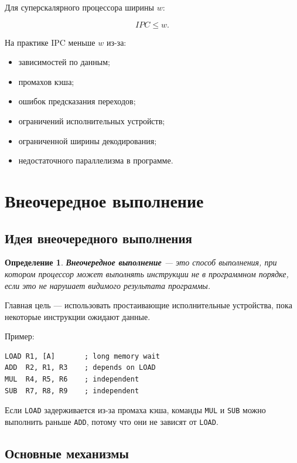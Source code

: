 \documentclass[12pt,a4paper]{article}
\newtheorem{definition}{Определение}
\begin{document}
Для суперскалярного процессора ширины $w$:

\[
    IPC \leq w.
\]

На практике IPC меньше $w$ из-за:

\begin{itemize}
    \item зависимостей по данным;
    \item промахов кэша;
    \item ошибок предсказания переходов;
    \item ограничений исполнительных устройств;
    \item ограниченной ширины декодирования;
    \item недостаточного параллелизма в программе.
\end{itemize}

\section{Внеочередное выполнение}

\subsection{Идея внеочередного выполнения}

\begin{definition}
\textbf{Внеочередное выполнение} --- это способ выполнения, при котором процессор может выполнять инструкции не в программном порядке, если это не нарушает видимого результата программы.
\end{definition}

Главная цель --- использовать простаивающие исполнительные устройства, пока некоторые инструкции ожидают данные.

Пример:

\begin{lstlisting}
LOAD R1, [A]       ; long memory wait
ADD  R2, R1, R3    ; depends on LOAD
MUL  R4, R5, R6    ; independent
SUB  R7, R8, R9    ; independent
\end{lstlisting}

Если \texttt{LOAD} задерживается из-за промаха кэша, команды \texttt{MUL} и \texttt{SUB} можно выполнить раньше \texttt{ADD}, потому что они не зависят от \texttt{LOAD}.

\subsection{Основные механизмы}
\end{document}
